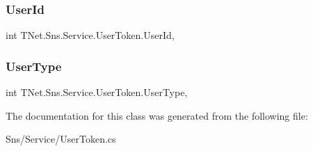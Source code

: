 \subsubsection{\texorpdfstring{User\+Id}{UserId}}
{\footnotesize\ttfamily int T\+Net.\+Sns.\+Service.\+User\+Token.\+User\+Id\hspace{0.3cm}{\ttfamily [get]}, {\ttfamily [set]}}





\mbox{\label{class_t_net_1_1_sns_1_1_service_1_1_user_token_a636ca2941a4d72ed60dd3be95c999849}} 
\subsubsection{\texorpdfstring{User\+Type}{UserType}}
{\footnotesize\ttfamily int T\+Net.\+Sns.\+Service.\+User\+Token.\+User\+Type\hspace{0.3cm}{\ttfamily [get]}, {\ttfamily [set]}}







The documentation for this class was generated from the following file\+:\begin{DoxyCompactItemize}
\item 
Sns/\+Service/User\+Token.\+cs\end{DoxyCompactItemize}
